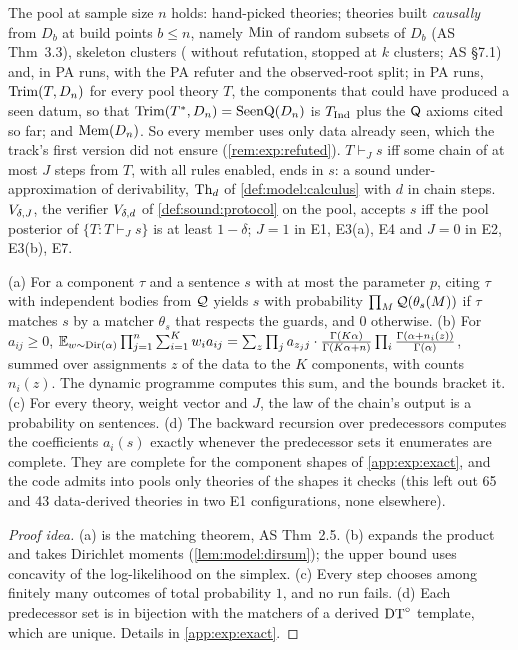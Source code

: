 The pool at sample size $n$ holds: hand-picked theories; theories built \emph{causally} from $D_b$ at build points $b\le n$, namely $\mathrm{Min}$ of random subsets of $D_b$ (AS Thm~3.3), skeleton clusters (\DTRC{} without refutation, stopped at $k$ clusters; AS \S7.1) and, in PA runs, \DTRC{} with the PA refuter and the observed-root split; in PA runs, $\mathrm{Trim}(T,D_n)$ for every pool theory $T$, the components that could have produced a seen datum, so that $\mathrm{Trim}(T^*,D_n)=\mathrm{SeenQ}(D_n)$ is $T_{\mathrm{Ind}}$ plus the $\mathsf{Q}$ axioms cited so far; and $\mathrm{Mem}(D_n)$. So every member uses only data already seen, which the track's first version did not ensure (\cref{rem:exp:refuted}). $T\vdash_Js$ iff some chain of at most $J$ steps from $T$, with all rules enabled, ends in $s$: a sound under-approximation of derivability, $\mathrm{Th}_d$ of \cref{def:model:calculus} with $d$ in chain steps. $V_{\delta,J}$, the verifier $V_{\delta,d}$ of \cref{def:sound:protocol} on the pool, accepts $s$ iff the pool posterior of $\{T:T\vdash_Js\}$ is at least $1-\delta$; $J=1$ in E1, E3(a), E4 and $J=0$ in E2, E3(b), E7.

\begin{proposition}\expbrk{}\label{prop:exp:exact}
\textup{(a)} For a component $\tau$ and a sentence $s$ with at most the parameter $p$, citing $\tau$ with independent bodies from $\mathcal{Q}$ yields $s$ with probability $\prod_M\mathcal{Q}(\theta_s(M))$ if $\tau$ matches $s$ by a matcher $\theta_s$ that respects the guards, and $0$ otherwise.
\textup{(b)} For $a_{ij}\ge0$, $\mathbb{E}_{w\sim\mathrm{Dir}(\alpha)}\prod_{j=1}^n\sum_{i=1}^Kw_ia_{ij}=\sum_z\prod_ja_{z_jj}\cdot\frac{\Gamma(K\alpha)}{\Gamma(K\alpha+n)}\prod_i\frac{\Gamma(\alpha+n_i(z))}{\Gamma(\alpha)}$, summed over assignments $z$ of the data to the $K$ components, with counts $n_i(z)$. The dynamic programme computes this sum, and the bounds bracket it.
\textup{(c)} For every theory, weight vector and $J$, the law of the chain's output is a probability on sentences.
\textup{(d)} The backward recursion over predecessors computes the \Lone{} coefficients $a_i(s)$ exactly whenever the predecessor sets it enumerates are complete. They are complete for the component shapes of \cref{app:exp:exact}, and the code admits into \Lone{} pools only theories of the shapes it checks (this left out 65 and 43 data-derived theories in two E1 configurations, none elsewhere).
\end{proposition}

\begin{proof}[Proof idea]
(a) is the matching theorem, AS Thm~2.5. (b) expands the product and takes Dirichlet moments (\cref{lem:model:dirsum}); the upper bound uses concavity of the log-likelihood on the simplex. (c) Every step chooses among finitely many outcomes of total probability $1$, and no run fails. (d) Each predecessor set is in bijection with the matchers of a derived $\mathrm{DT}^{\circ}$ template, which are unique. Details in \cref{app:exp:exact}.
\end{proof}

